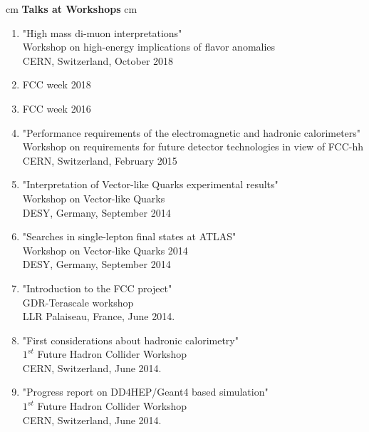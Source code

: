 \documentclass[12pt]{article}
\begin{document}
 cm
{\bf  \large  Talks at Workshops}
 cm
\begin{enumerate} 

\item "High mass di-muon interpretations"\\
Workshop on high-energy implications of flavor anomalies\\
CERN, Switzerland, October 2018


\item FCC week 2018

\item FCC week 2016


\item "Performance requirements of the electromagnetic and hadronic calorimeters"\\
Workshop on requirements for future detector technologies in view of FCC-hh\\
CERN, Switzerland, February 2015

\item "Interpretation of Vector-like Quarks experimental results"\\
Workshop on Vector-like Quarks\\
DESY, Germany, September 2014

\item "Searches in single-lepton final states at ATLAS"\\
Workshop on Vector-like Quarks 2014 \\
DESY, Germany, September 2014

\item "Introduction to the FCC project"\\
GDR-Terascale workshop\\
 LLR Palaiseau, France, June 2014.

\item "First considerations about hadronic calorimetry"\\
$1^{st}$ Future Hadron Collider Workshop\\
CERN, Switzerland, June 2014.

\item "Progress report on DD4HEP/Geant4 based simulation"\\
$1^{st}$ Future Hadron Collider Workshop\\
CERN, Switzerland, June 2014.




\end{enumerate}
\end{document}
